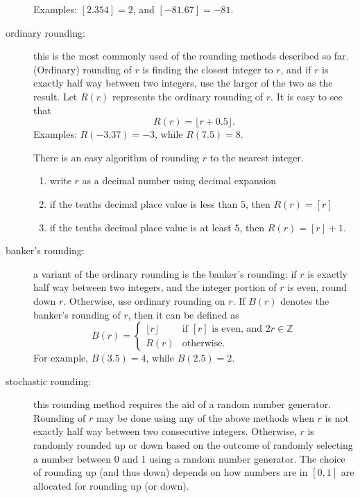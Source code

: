 \documentclass[12pt]{article}
\begin{document}
\begin{description}
Examples: $[2.354]=2$, and $[-81.67]=-81$.
\item[ordinary rounding:] this is the most commonly used of the rounding methods described so far.  (Ordinary) rounding of $r$ is finding the closest integer to $r$, and if $r$ is exactly half way between two integers, use the larger of the two as the result.  Let $R(r)$ represents the ordinary rounding of $r$.  It is easy to see that $$R(r)=\lfloor r+0.5 \rfloor.$$  Examples: $R(-3.37)=-3$, while $R(7.5)=8$.

There is an easy algorithm of rounding $r$ to the nearest integer.
\begin{enumerate}
\item write $r$ as a decimal number using decimal expansion
\item if the tenths decimal place value is less than $5$, then $R(r)=[r]$
\item if the tenths decimal place value is at least $5$, then $R(r)=[r]+1$.
\end{enumerate}
\item[banker's rounding:] a variant of the ordinary rounding is the banker's rounding: if $r$ is exactly half way between two integers, and the integer portion of $r$ is even, round down $r$.  Otherwise, use ordinary rounding on $r$.  If $B(r)$ denotes the banker's rounding of $r$, then it can be defined as
\begin{displaymath}
B(r) = \left\{
\begin{array}{ll}
\lfloor r \rfloor & \textrm{if $[r]$ is even, and $2r\in \mathbb{Z}$}\\
R(r) & \textrm{otherwise.}
\end{array}
\right.
\end{displaymath}
For example, $B(3.5)=4$, while $B(2.5)=2$.

\item[stochastic rounding:] this rounding method requires the aid of a random number generator.  Rounding of $r$ may be done using any of the above methods when $r$ is not exactly half way between two consecutive integers.  Otherwise, $r$ is randomly rounded up or down based on the outcome of randomly selecting a number between 0 and 1 using a random number generator.   The choice of rounding up (and thus down) depends on how numbers are in $[0,1]$ are allocated for rounding up (or down).


\end{description}
\end{document}
